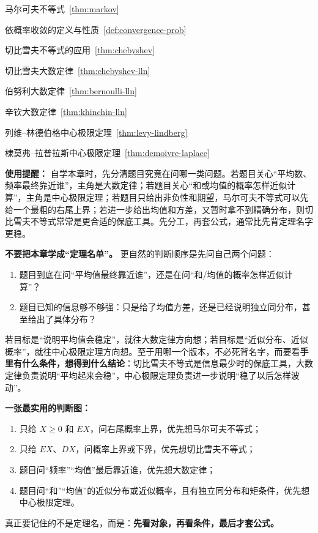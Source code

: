 ﻿\documentclass[lang=cn,11pt]{elegantbook}
\begin{document}
\begin{introduction}
    \item 马尔可夫不等式~\ref{thm:markov}
    \item 依概率收敛的定义与性质~\ref{def:convergence-prob}
    \item 切比雪夫不等式的应用~\ref{thm:chebyshev}
    \item 切比雪夫大数定律~\ref{thm:chebyshev-lln}
    \item 伯努利大数定律~\ref{thm:bernoulli-lln}
    \item 辛钦大数定律~\ref{thm:khinchin-lln}
    \item 列维--林德伯格中心极限定理~\ref{thm:levy-lindberg}
    \item 棣莫弗--拉普拉斯中心极限定理~\ref{thm:demoivre-laplace}
\end{introduction}

\begin{note}
\textbf{使用提醒：} 自学本章时，先分清题目究竟在问哪一类问题。若题目关心“平均数、频率最终靠近谁”，主角是大数定律；若题目关心“和或均值的概率怎样近似计算”，主角是中心极限定理；若题目只给出非负性和期望，马尔可夫不等式可以先给一个最粗的右尾上界；若进一步给出均值和方差，又暂时拿不到精确分布，则切比雪夫不等式常常是更合适的保底工具。先分工，再套公式，通常比先背定理名字更稳。
\end{note}

\begin{note}
\textbf{不要把本章学成“定理名单”。} 更自然的判断顺序是先问自己两个问题：
\begin{enumerate}
    \item 题目到底在问“平均值最终靠近谁”，还是在问“和/均值的概率怎样近似计算”？
    \item 题目已知的信息够不够强：只是给了均值方差，还是已经说明独立同分布，甚至给出了具体分布？
\end{enumerate}

若目标是“说明平均值会稳定”，就往大数定律方向想；若目标是“近似分布、近似概率”，就往中心极限定理方向想。至于用哪一个版本，不必死背名字，而要看\textbf{手里有什么条件，想得到什么结论}：切比雪夫不等式是信息最少时的保底工具，大数定律负责说明“平均起来会稳”，中心极限定理负责进一步说明“稳了以后怎样波动”。
\end{note}

\begin{note}
\textbf{一张最实用的判断图：}
\begin{enumerate}
    \item 只给 \(X\ge 0\) 和 \(EX\)，问右尾概率上界，优先想马尔可夫不等式；
    \item 只给 \(EX\)、\(DX\)，问概率上界或下界，优先想切比雪夫不等式；
    \item 题目问“频率”“均值”最后靠近谁，优先想大数定律；
    \item 题目问“和”“均值”的近似分布或近似概率，且有独立同分布和矩条件，优先想中心极限定理。
\end{enumerate}

真正要记住的不是定理名，而是：\textbf{先看对象，再看条件，最后才套公式。}
\end{note}
\end{document}
